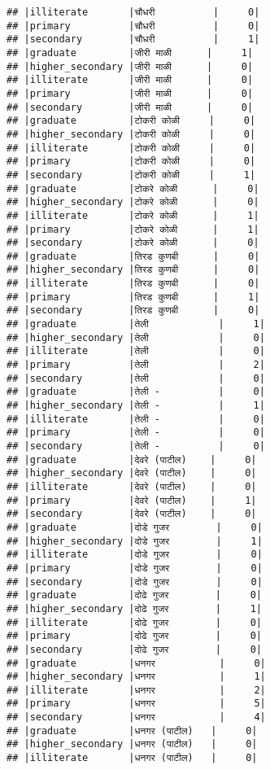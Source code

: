 \documentclass[
]{article}
\begin{document}
\begin{verbatim}
## |illiterate       |चौधरी          |     0|
## |primary          |चौधरी          |     0|
## |secondary        |चौधरी          |     1|
## |graduate         |जीरी माळी      |     1|
## |higher_secondary |जीरी माळी      |     0|
## |illiterate       |जीरी माळी      |     0|
## |primary          |जीरी माळी      |     0|
## |secondary        |जीरी माळी      |     0|
## |graduate         |टोकरी कोळी     |     0|
## |higher_secondary |टोकरी कोळी     |     0|
## |illiterate       |टोकरी कोळी     |     0|
## |primary          |टोकरी कोळी     |     0|
## |secondary        |टोकरी कोळी     |     1|
## |graduate         |टोकरे कोळी      |     0|
## |higher_secondary |टोकरे कोळी      |     0|
## |illiterate       |टोकरे कोळी      |     1|
## |primary          |टोकरे कोळी      |     1|
## |secondary        |टोकरे कोळी      |     0|
## |graduate         |तिरड कुणबी      |     0|
## |higher_secondary |तिरड कुणबी      |     0|
## |illiterate       |तिरड कुणबी      |     0|
## |primary          |तिरड कुणबी      |     1|
## |secondary        |तिरड कुणबी      |     0|
## |graduate         |तेली            |     1|
## |higher_secondary |तेली            |     0|
## |illiterate       |तेली            |     0|
## |primary          |तेली            |     2|
## |secondary        |तेली            |     0|
## |graduate         |तेली -          |     0|
## |higher_secondary |तेली -          |     1|
## |illiterate       |तेली -          |     0|
## |primary          |तेली -          |     0|
## |secondary        |तेली -          |     0|
## |graduate         |देवरे (पाटील)    |     0|
## |higher_secondary |देवरे (पाटील)    |     0|
## |illiterate       |देवरे (पाटील)    |     0|
## |primary          |देवरे (पाटील)    |     1|
## |secondary        |देवरे (पाटील)    |     0|
## |graduate         |दोडे गुजर        |     0|
## |higher_secondary |दोडे गुजर        |     1|
## |illiterate       |दोडे गुजर        |     0|
## |primary          |दोडे गुजर        |     0|
## |secondary        |दोडे गुजर        |     0|
## |graduate         |दोढे गुजर        |     0|
## |higher_secondary |दोढे गुजर        |     1|
## |illiterate       |दोढे गुजर        |     0|
## |primary          |दोढे गुजर        |     0|
## |secondary        |दोढे गुजर        |     0|
## |graduate         |धनगर           |     0|
## |higher_secondary |धनगर           |     1|
## |illiterate       |धनगर           |     2|
## |primary          |धनगर           |     5|
## |secondary        |धनगर           |     4|
## |graduate         |धनगर (पाटील)   |     0|
## |higher_secondary |धनगर (पाटील)   |     0|
## |illiterate       |धनगर (पाटील)   |     0|

\end{verbatim}
\end{document}
